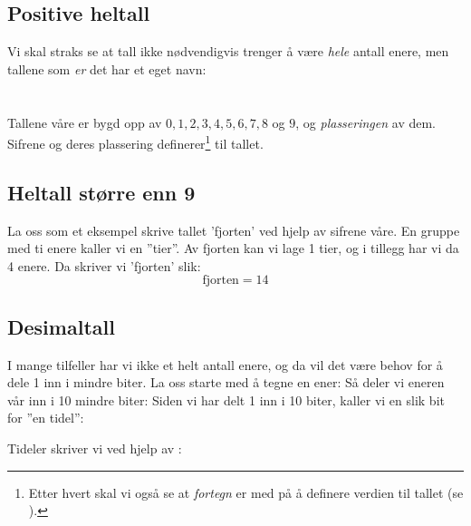 \subsection*{Positive heltall}
Vi skal straks se at tall ikke nødvendigvis trenger å være \textsl{hele} antall enere, men tallene som \textsl{er} det har et eget navn:\regv


\newpage
\section{\talsifverd}
Tallene våre er bygd opp av  $ 0, 1, 2 , 3, 4, 5, 6, 7, 8 $ og $ 9 $, og \textsl{plasseringen} av dem. Sifrene og deres plassering definerer\footnote{Etter hvert skal vi også se at \textit{fortegn} er med på å definere verdien til tallet (se ).}   til tallet.
\subsection*{Heltall større enn 9}
La oss som et eksempel skrive tallet 'fjorten' ved hjelp av sifrene våre.
En gruppe med ti enere kaller vi en ''tier''. Av fjorten kan vi lage 1 tier, og i tillegg har vi da 4 enere. Da skriver vi 'fjorten' slik:
\[ \text{fjorten}=14 \]
\vsk

\newpage
\subsection*{Desimaltall}
I mange tilfeller har vi ikke et helt antall enere, og da vil det være behov for å dele 1 inn i mindre biter. La oss starte med å tegne en ener:
Så deler vi eneren vår inn i 10 mindre biter:
Siden vi har delt 1 inn i 10 biter, kaller vi en slik bit for ''en tidel'':
\begin{comment}
\eks{\vs
	\fig{maal2}
	\fig{des2}
}\vsk
\end{comment}
Tideler skriver vi ved hjelp av   \sym{,}  :
\regv
{}
\newpage
